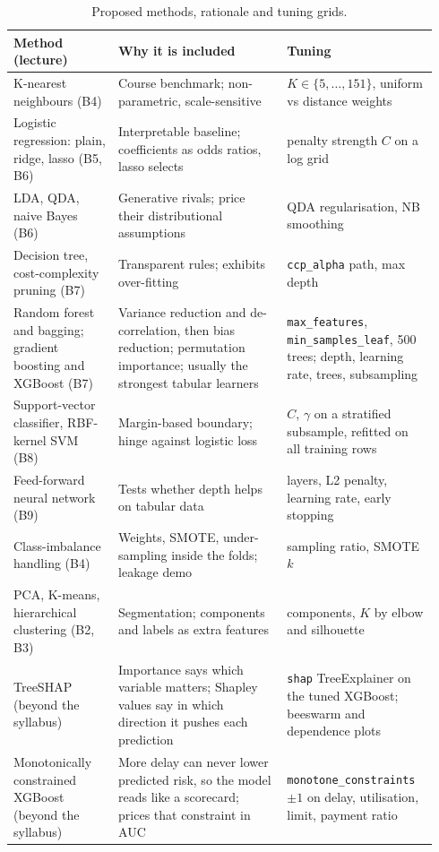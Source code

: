 \documentclass{article}
\begin{document}
\begin{table}[t]
  \caption{Proposed methods, rationale and tuning grids.}
  \label{tab:methods}
  \centering
  \small
  \begin{tabular}{@{}L{0.235\linewidth}L{0.375\linewidth}L{0.325\linewidth}@{}}
    \toprule
    Method (lecture) & Why it is included & Tuning \\
    \midrule
    K-nearest neighbours (B4) & Course benchmark; non-parametric, scale-sensitive & $K \in \{5,\dots,151\}$, uniform vs distance weights \\
    Logistic regression: plain, ridge, lasso (B5, B6) & Interpretable baseline; coefficients as odds ratios, lasso selects & penalty strength $C$ on a log grid \\
    LDA, QDA, naive Bayes (B6) & Generative rivals; price their distributional assumptions & QDA regularisation, NB smoothing \\
    Decision tree, cost-complexity pruning (B7) & Transparent rules; exhibits over-fitting & \texttt{ccp\_alpha} path, max depth \\
    Random forest and bagging; gradient boosting and XGBoost (B7) & Variance reduction and de-correlation, then bias reduction; permutation importance; usually the strongest tabular learners & \texttt{max\_features}, \texttt{min\_samples\_leaf}, 500 trees; depth, learning rate, trees, subsampling \\
    Support-vector classifier, RBF-kernel SVM (B8) & Margin-based boundary; hinge against logistic loss & $C$, $\gamma$ on a stratified subsample, refitted on all training rows \\
    Feed-forward neural network (B9) & Tests whether depth helps on tabular data & layers, L2 penalty, learning rate, early stopping \\
    Class-imbalance handling (B4) & Weights, SMOTE, under-sampling inside the folds; leakage demo & sampling ratio, SMOTE $k$ \\
    PCA, K-means, hierarchical clustering (B2, B3) & Segmentation; components and labels as extra features & components, $K$ by elbow and silhouette \\
    TreeSHAP (beyond the syllabus) & Importance says which variable matters; Shapley values say in which direction it pushes each prediction & \texttt{shap} TreeExplainer on the tuned XGBoost; beeswarm and dependence plots \\
    Monotonically constrained XGBoost (beyond the syllabus) & More delay can never lower predicted risk, so the model reads like a scorecard; prices that constraint in AUC & \texttt{monotone\_constraints} $\pm 1$ on delay, utilisation, limit, payment ratio \\
    \bottomrule
  \end{tabular}
\end{table}
\end{document}
